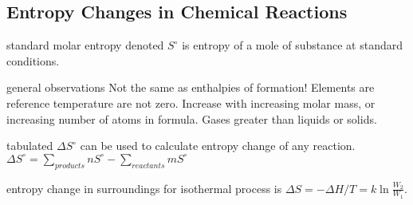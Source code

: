 \begin{mdframed}
\begin{multicols}{2}
\subsection{Entropy Changes in Chemical Reactions}
\begin{compactdesc}
    \item[standard molar entropy] denoted $S^\circ$ is entropy of a mole of
        substance at standard conditions.
    \item[general observations] Not the same as enthalpies of
        formation! Elements are reference temperature are not zero.
        Increase with increasing molar mass, or increasing number of atoms in
        formula. Gases greater than liquids or solids.
    \item[tabulated $\Delta S^\circ$] can be used to calculate entropy change of
        any reaction.
        $\Delta S^\circ = \sum_{products} nS^\circ - \sum_{reactants} mS^\circ$
    \item[entropy change in surroundings] for isothermal process is
        $\Delta S = -\Delta H/T = k \ln \frac {W_2} {W_1} $.
\end{compactdesc}
\end{multicols}
\end{mdframed}






